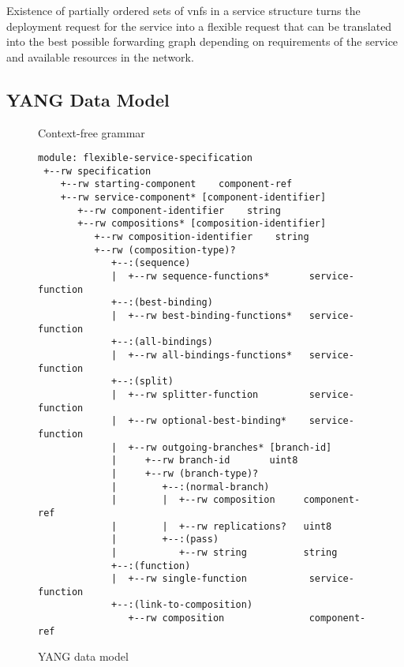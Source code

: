 \documentclass{sig-alternate-per}
\begin{document}
Existence of partially ordered sets of \acp{vnf} in a service structure turns the
deployment request for the service into a flexible request that can be translated
into the best possible forwarding graph depending on requirements of the service
and available resources in the network.


\subsection{YANG Data Model}
\label{subsec:yang}

\begin{figure}[!t]
{\scriptsize
  
}
\vspace{-18pt}
\caption{Context-free grammar}
\label{fig:grammar}
\end{figure}

\begin{figure}[!t]
{\scriptsize
\begin{verbatim}
module: flexible-service-specification
 +--rw specification
    +--rw starting-component    component-ref
    +--rw service-component* [component-identifier]
       +--rw component-identifier    string
       +--rw compositions* [composition-identifier]
          +--rw composition-identifier    string
          +--rw (composition-type)?
             +--:(sequence)
             |  +--rw sequence-functions*       service-function
             +--:(best-binding)
             |  +--rw best-binding-functions*   service-function
             +--:(all-bindings)
             |  +--rw all-bindings-functions*   service-function
             +--:(split)
             |  +--rw splitter-function         service-function
             |  +--rw optional-best-binding*    service-function
             |  +--rw outgoing-branches* [branch-id]
             |     +--rw branch-id       uint8
             |     +--rw (branch-type)?
             |        +--:(normal-branch)
             |        |  +--rw composition     component-ref
             |        |  +--rw replications?   uint8
             |        +--:(pass)
             |           +--rw string          string
             +--:(function)
             |  +--rw single-function           service-function
             +--:(link-to-composition)
                +--rw composition               component-ref 
\end{verbatim}
}
\caption{YANG data model}
\label{fig:yangmodel}
\end{figure}
\end{document}

